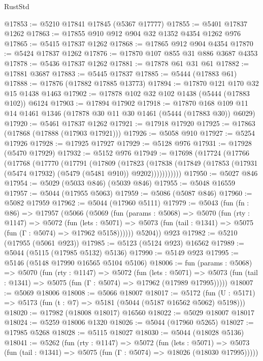 \begin{lexlean}{RustStd}
\begin{coremodule}
@17853 := @5210 @17841 @17845 (@5367 @17777)
@17855 := @5401 @17837 @1262
@17863 := @17855 @910 @912 @904 @32 @1352 @4354 @1262 @976
@17865 := @5415 @17837 @1262
@17868 := @17865 @912 @904 @4354
@17870 := @5424 @17837 @1262
@17876 := @17870 @107 @855 @31 @886 @3687 @4353
@17878 := @5436 @17837 @1262
@17881 := @17878 @61 @31 @61
@17882 := @17881 @3687
@17883 := @5445 @17837
@17885 := @5444 (@17883 @61)
@17888 := @17876 (@17882 @17885 @13773)
@17894 := @17870 @121 @170 @32 @15 @1438 @1463
@17902 := @17878 @102 @32 @102 @1438 (@5444 (@17883 @102)) @6124
@17903 := @17894 @17902
@17918 := @17870 @168 @109 @11 @14 @1461 @1346 (@17878 @30 @11 @30 @1461 (@5444 (@17883 @30)) @6029)
@17920 := @5461 @17837 @1262
@17921 := @17918 @17920
@17925 := @17863 (@17868 (@17888 (@17903 @17921)))
@17926 := @5058 @910
@17927 := @5254 @17926
@17928 := @17925 @17927
@17929 := @5128 @976
@17931 := @17928 (@5470 @17929)
@17932 := @5152 @976
@17949 := @17698
    (@17724
      (@17766
        (@17768
          (@17770
            (@17791
              (@17809
                (@17823
                  (@17838
                    (@17849 (@17853 (@17931 (@5474 @17932) (@5479 (@5481 @910)) @9202)))))))))))
@17950 := @5027 @846
@17954 := @5029 (@5033 @846) (@5039 @846)
@17955 := @5048 @16559
@17957 := @5044 (@17955 @5063)
@17959 := @5086 (@5087 @846)
@17960 := @5082 @17959
@17962 := @5044 (@17960 @5111)
@17979 := @5043
    (fun (fn : @86) =>
    @17957
      (@5066
        (@5069
          (fun (params : @5068) =>
          @5070
            (fun (rty : @1147) =>
            @5072
              (fun (lets : @5071) =>
              @5073 (fun (tail : @1341) => @5075 (fun (Γ : @5074) => @17962 @5158))))))
        @5204))
    @923
@17982 := @5210 (@17955 (@5061 @923))
@17985 := @5123 (@5124 @923) @16562
@17989 := @5044 (@5115 (@17985 @5132) @5136)
@17990 := @5149 @923
@17995 := @5146 (@5148 @17990 @16565 @5104 @5106)
@18006 := fun (params : @5068) =>
  @5070
    (fun (rty : @1147) =>
    @5072
      (fun (lets : @5071) =>
      @5073 (fun (tail : @1341) => @5075 (fun (Γ : @5074) => @17962 (@17989 @17995)))))
@18007 := @5069 @18006
@18008 := @5066 @18007
@18017 := @5172
    (fun (U : @5171) => @5173 (fun (t : @7) => @5181 (@5044 (@5187 @16562 @5062) @5198)))
@18020 := @17982 (@18008 @18017) @16560
@18022 := @5029 @18007 @18017
@18024 := @5259 @18006 @1320
@18026 := @5044 (@17960 @5265)
@18027 := @17985 @5268
@18028 := @5115 @18027
@18030 := @5044 (@18028 @5136)
@18041 := @5262
    (fun (rty : @1147) =>
    @5072
      (fun (lets : @5071) =>
      @5073 (fun (tail : @1341) => @5075 (fun (Γ : @5074) => @18026 (@18030 @17995)))))

\end{coremodule}
\end{lexlean}
